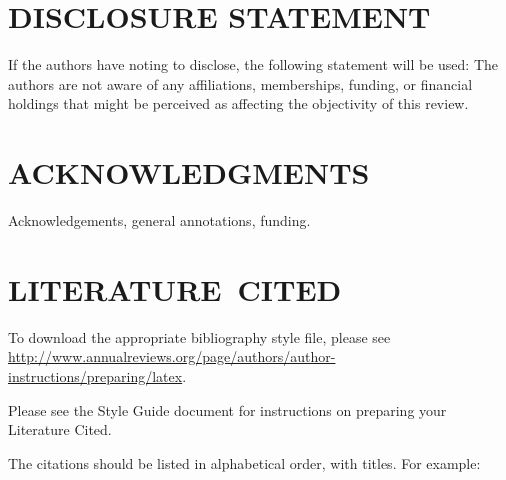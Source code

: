 \documentclass{ar-1col}
\begin{document}
\section*{DISCLOSURE STATEMENT}
If the authors have noting to disclose, the following statement will be used: The authors are not aware of any affiliations, memberships, funding, or financial holdings that
might be perceived as affecting the objectivity of this review. 

\section*{ACKNOWLEDGMENTS}
Acknowledgements, general annotations, funding.

%
\section*{LITERATURE\ CITED}

To download the appropriate bibliography style file, please see \url{http://www.annualreviews.org/page/authors/author-instructions/preparing/latex}. 



\noindent
Please see the Style Guide document for instructions on preparing your Literature Cited.

The citations should be listed in alphabetical order, with titles. For example:
\end{document}
